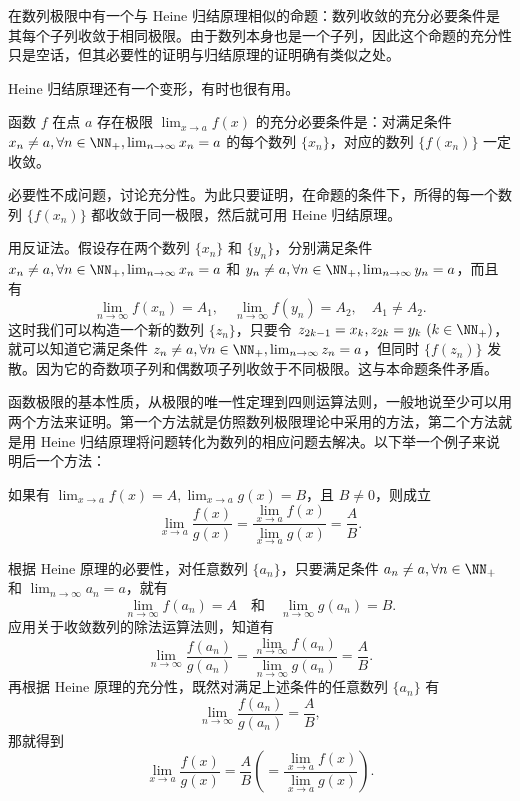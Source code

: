 \begin{xremark}
在数列极限中有一个与 Heine 归结原理相似的命题：数列收敛的充分必要条件是其每个子列收敛于相同极限。由于数列本身也是一个子列，因此这个命题的充分性只是空话，但其必要性的证明与归结原理的证明确有类似之处。
\end{xremark}

Heine 归结原理还有一个变形，有时也很有用。

\begin{xproposition}
函数 $f$ 在点 $a$ 存在极限 $\lim_{x\to a}f(x)$ 的充分必要条件是：对满足条件 $x_n\ne a,\forall n\in\NN_+,\lim_{n\to\infty}x_n=a$ 的每个数列 $\{x_n\}$，对应的数列 $\{f(x_n)\}$ 一定收敛。
\end{xproposition}
\begin{xproof}
必要性不成问题，讨论充分性。为此只要证明，在命题的条件下，所得的每一个数列 $\{f(x_n)\}$ 都收敛于同一极限，然后就可用 Heine 归结原理。

用反证法。假设存在两个数列 $\{x_n\}$ 和 $\{y_n\}$，分别满足条件 $x_n\ne a,\forall n\in\NN_+,\lim_{n\to\infty}x_n=a$ 和 $y_n\ne a,\forall n\in\NN_+,\lim_{n\to\infty}y_n=a$，而且有
\[
  \lim_{n\to\infty}f(x_n)=A_1,\quad \lim_{n\to\infty}f(y_n)=A_2,\quad A_1\ne A_2.
\]
这时我们可以构造一个新的数列 $\{z_n\}$，只要令 $z_{2k-1}=x_k,z_{2k}=y_k\ (k\in\NN_+)$，就可以知道它满足条件 $z_n\ne a,\forall n\in\NN_+,\lim_{n\to\infty}z_n=a$，但同时 $\{f(z_n)\}$ 发散。因为它的奇数项子列和偶数项子列收敛于不同极限。这与本命题条件矛盾。
\end{xproof}

函数极限的基本性质，从极限的唯一性定理到四则运算法则，一般地说至少可以用两个方法来证明。第一个方法就是仿照数列极限理论中采用的方法，第二个方法就是用 Heine 归结原理将问题转化为数列的相应问题去解决。以下举一个例子来说明后一个方法：

\begin{xexample}[4.2.1（函数极限的除法运算法则）]
如果有 $\lim_{x\to a}f(x)=A,\lim_{x\to a}g(x)=B$，且 $B\ne0$，则成立
\[
  \lim_{x\to a}\frac{f(x)}{g(x)}
  =\frac{\lim_{x\to a}f(x)}{\lim_{x\to a}g(x)}
  =\frac AB.
\]
\end{xexample}
\begin{xproof}
根据 Heine 原理的必要性，对任意数列 $\{a_n\}$，只要满足条件 $a_n\ne a,\forall n\in\NN_+$ 和 $\lim_{n\to\infty}a_n=a$，就有
\[
  \lim_{n\to\infty}f(a_n)=A\quad\text{和}\quad\lim_{n\to\infty}g(a_n)=B.
\]
应用关于收敛数列的除法运算法则，知道有
\[
  \lim_{n\to\infty}\frac{f(a_n)}{g(a_n)}
  =\frac{\lim_{n\to\infty}f(a_n)}{\lim_{n\to\infty}g(a_n)}
  =\frac AB.
\]
再根据 Heine 原理的充分性，既然对满足上述条件的任意数列 $\{a_n\}$ 有
\[
  \lim_{n\to\infty}\frac{f(a_n)}{g(a_n)}=\frac AB,
\]
那就得到
\[
  \lim_{x\to a}\frac{f(x)}{g(x)}=\frac AB
  \left(=\frac{\lim_{x\to a}f(x)}{\lim_{x\to a}g(x)}\right).
\]
\end{xproof}

